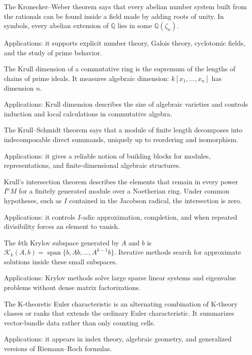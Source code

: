 The Kronecker--Weber theorem says that every abelian number system built from the rationals can be found inside a field made by adding roots of unity. In symbols, every abelian extension of $\mathbb Q$ lies in some $\mathbb Q(\zeta_n)$. \par\noindent Applications: it supports explicit number theory, Galois theory, cyclotomic fields, and the study of prime behavior.

The Krull dimension of a commutative ring is the supremum of the lengths of chains of prime ideals. It measures algebraic dimension: $k[x_1,\ldots,x_n]$ has dimension $n$. \par\noindent Applications: Krull dimension describes the size of algebraic varieties and controls induction and local calculations in commutative algebra.

The Krull--Schmidt theorem says that a module of finite length decomposes into indecomposable direct summands, uniquely up to reordering and isomorphism. \par\noindent Applications: it gives a reliable notion of building blocks for modules, representations, and finite-dimensional algebraic structures.

Krull's intersection theorem describes the elements that remain in every power $I^nM$ for a finitely generated module over a Noetherian ring. Under common hypotheses, such as $I$ contained in the Jacobson radical, the intersection is zero. \par\noindent Applications: it controls $I$-adic approximation, completion, and when repeated divisibility forces an element to vanish.

The $k$th Krylov subspace generated by $A$ and $b$ is $\mathcal K_k(A,b)=\operatorname{span}\{b,Ab,\ldots,A^{k-1}b\}$. Iterative methods search for approximate solutions inside these small subspaces. \par\noindent Applications: Krylov methods solve large sparse linear systems and eigenvalue problems without dense matrix factorizations.

The K-theoretic Euler characteristic is an alternating combination of K-theory classes or ranks that extends the ordinary Euler characteristic. It summarizes vector-bundle data rather than only counting cells. \par\noindent Applications: it appears in index theory, algebraic geometry, and generalized versions of Riemann--Roch formulas.

